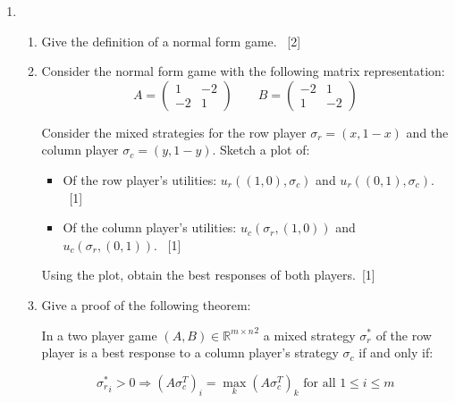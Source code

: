 \documentclass[12pt,a4paper]{article}
\renewcommand{\labelenumi}{\arabic{enumi}} %
\begin{document}
\null \vskip1cm
\begin{enumerate}

\renewcommand\labelenumi{\bfseries\theenumi.}

\item

    \begin{enumerate}
        \item Give the definition of a normal form game.
        ~\hfill{[2]}
        \item Consider the normal form game with
            the following matrix representation:
            $$A=
                \begin{pmatrix}
                    1 & -2\\
                    -2 & 1
                \end{pmatrix}
              \qquad
              B=
                \begin{pmatrix}
                    -2 & 1\\
                    1 & -2
                \end{pmatrix}
            $$

            Consider the mixed strategies for the row player
            \(\sigma_r=(x,1-x)\) and the column player \(\sigma_c=(y,1-y)\).
            Sketch a plot of:

            \begin{itemize}
                \item Of the row player's utilities: \(u_r((1, 0), \sigma_c)\)
                    and \(u_r((0, 1), \sigma_c)\).
                    ~\hfill{[1]}
                \item Of the column player's utilities: \(u_c(\sigma_r, (1, 0))\)
                    and \(u_c(\sigma_r, (0, 1))\).
                    ~\hfill{[1]}
            \end{itemize}

            Using the plot, obtain the best responses of both
            players.~\hfill{[1]}

        \item Give a proof of the following theorem:

              In a two player game $(A,B)\in{\mathbb{R}^{m\times n}}^2$ a mixed
              strategy $\sigma_r^*$  of the row player is a best response to a
              column player's strategy $\sigma_c$ if and only if:

              $${\sigma_r^*}_i > 0 \Rightarrow (A\sigma_c^T)_i =
              \max_{k}(A\sigma_c^T)_k\text{ for all }1\leq i\leq m$$


\end{enumerate}
\end{enumerate}
\end{document}
